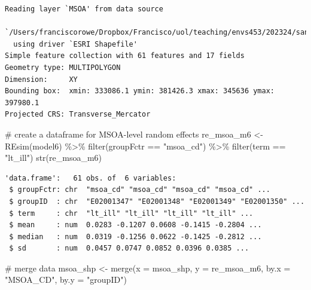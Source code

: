 \documentclass[
  letterpaper,
  DIV=11,
  numbers=noendperiod,
  oneside]{scrreprt}
\newenvironment{Shaded}{\begin{snugshade}}{\end{snugshade}}
\newcommand{\AttributeTok}[1]{\textcolor[rgb]{0.40,0.45,0.13}{#1}}
\newcommand{\CommentTok}[1]{\textcolor[rgb]{0.37,0.37,0.37}{#1}}
\newcommand{\FunctionTok}[1]{\textcolor[rgb]{0.28,0.35,0.67}{#1}}
\newcommand{\NormalTok}[1]{\textcolor[rgb]{0.00,0.23,0.31}{#1}}
\newcommand{\OtherTok}[1]{\textcolor[rgb]{0.00,0.23,0.31}{#1}}
\newcommand{\SpecialCharTok}[1]{\textcolor[rgb]{0.37,0.37,0.37}{#1}}
\newcommand{\StringTok}[1]{\textcolor[rgb]{0.13,0.47,0.30}{#1}}
\begin{document}
\begin{verbatim}
Reading layer `MSOA' from data source 
  `/Users/franciscorowe/Dropbox/Francisco/uol/teaching/envs453/202324/san/data/mlm/MSOA.shp' 
  using driver `ESRI Shapefile'
Simple feature collection with 61 features and 17 fields
Geometry type: MULTIPOLYGON
Dimension:     XY
Bounding box:  xmin: 333086.1 ymin: 381426.3 xmax: 345636 ymax: 397980.1
Projected CRS: Transverse_Mercator
\end{verbatim}

\begin{Shaded}
\begin{Highlighting}[]
\CommentTok{\# create a dataframe for MSOA{-}level random effects}
\NormalTok{re\_msoa\_m6 }\OtherTok{\textless{}{-}} \FunctionTok{REsim}\NormalTok{(model6) }\SpecialCharTok{\%\textgreater{}\%} \FunctionTok{filter}\NormalTok{(groupFctr }\SpecialCharTok{==} \StringTok{"msoa\_cd"}\NormalTok{) }\SpecialCharTok{\%\textgreater{}\%}
  \FunctionTok{filter}\NormalTok{(term }\SpecialCharTok{==} \StringTok{"lt\_ill"}\NormalTok{)}
\FunctionTok{str}\NormalTok{(re\_msoa\_m6)}
\end{Highlighting}
\end{Shaded}

\begin{verbatim}
'data.frame':   61 obs. of  6 variables:
 $ groupFctr: chr  "msoa_cd" "msoa_cd" "msoa_cd" "msoa_cd" ...
 $ groupID  : chr  "E02001347" "E02001348" "E02001349" "E02001350" ...
 $ term     : chr  "lt_ill" "lt_ill" "lt_ill" "lt_ill" ...
 $ mean     : num  0.0283 -0.1207 0.0608 -0.1415 -0.2804 ...
 $ median   : num  0.0319 -0.1256 0.0622 -0.1425 -0.2812 ...
 $ sd       : num  0.0457 0.0747 0.0852 0.0396 0.0385 ...
\end{verbatim}

\begin{Shaded}
\begin{Highlighting}[]
\CommentTok{\# merge data}
\NormalTok{msoa\_shp }\OtherTok{\textless{}{-}} \FunctionTok{merge}\NormalTok{(}\AttributeTok{x =}\NormalTok{ msoa\_shp, }\AttributeTok{y =}\NormalTok{ re\_msoa\_m6, }\AttributeTok{by.x =} \StringTok{"MSOA\_CD"}\NormalTok{, }\AttributeTok{by.y =} \StringTok{"groupID"}\NormalTok{)}
\end{Highlighting}
\end{Shaded}
\end{document}
